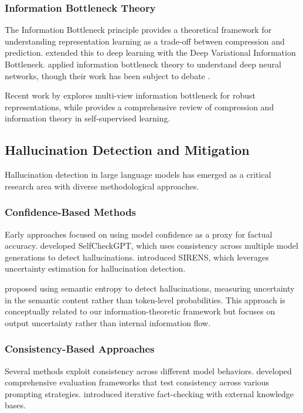 \subsubsection{Information Bottleneck Theory}
The Information Bottleneck principle \citep{tishby2000information} provides a theoretical framework for understanding representation learning as a trade-off between compression and prediction. \citet{alemi2017deep} extended this to deep learning with the Deep Variational Information Bottleneck. \citet{shwartz2017opening} applied information bottleneck theory to understand deep neural networks, though their work has been subject to debate \citep{saxe2019information}.

Recent work by \citet{federici2020learning} explores multi-view information bottleneck for robust representations, while \citet{shwartz2023compress} provides a comprehensive review of compression and information theory in self-supervised learning.

\subsection{Hallucination Detection and Mitigation}
\label{subsec:hallucination_detection}

Hallucination detection in large language models has emerged as a critical research area with diverse methodological approaches.

\subsubsection{Confidence-Based Methods}
Early approaches focused on using model confidence as a proxy for factual accuracy. \citet{manakul2023selfcheckgpt} developed SelfCheckGPT, which uses consistency across multiple model generations to detect hallucinations. \citet{zhang2023sirens} introduced SIRENS, which leverages uncertainty estimation for hallucination detection.

\citet{farquhar2024detecting} proposed using semantic entropy to detect hallucinations, measuring uncertainty in the semantic content rather than token-level probabilities. This approach is conceptually related to our information-theoretic framework but focuses on output uncertainty rather than internal information flow.

\subsubsection{Consistency-Based Approaches}
Several methods exploit consistency across different model behaviors. \citet{li2023halueval} developed comprehensive evaluation frameworks that test consistency across various prompting strategies. \citet{peng2023check} introduced iterative fact-checking with external knowledge bases.

